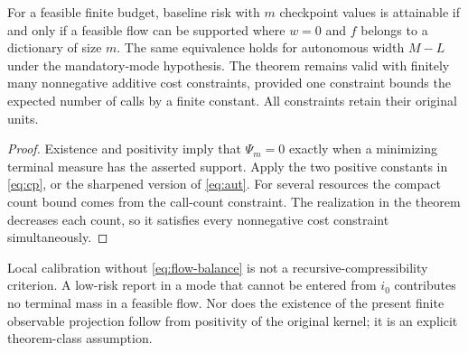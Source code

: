 \begin{corollary}\label{cor:zero}
For a feasible finite budget, baseline risk with $m$ checkpoint values is attainable if and only if a feasible flow can be supported where $w=0$ and $f$ belongs to a dictionary of size $m$. The same equivalence holds for autonomous width $M-L$ under the mandatory-mode hypothesis. The theorem remains valid with finitely many nonnegative additive cost constraints, provided one constraint bounds the expected number of calls by a finite constant. All constraints retain their original units.
\end{corollary}
\begin{proof}
Existence and positivity imply that $\Psi_m=0$ exactly when a minimizing terminal measure has the asserted support. Apply the two positive constants in \eqref{eq:cp}, or the sharpened version of \eqref{eq:aut}. For several resources the compact count bound comes from the call-count constraint. The realization in the theorem decreases each count, so it satisfies every nonnegative cost constraint simultaneously.
\end{proof}

Local calibration without \eqref{eq:flow-balance} is not a recursive-compressibility criterion. A low-risk report in a mode that cannot be entered from $i_0$ contributes no terminal mass in a feasible flow. Nor does the existence of the present finite observable projection follow from positivity of the original kernel; it is an explicit theorem-class assumption.
